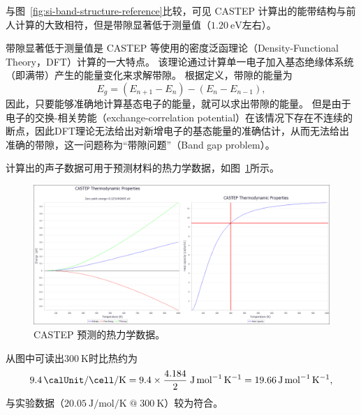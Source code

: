 与图~\ref{fig:si-band-structure-reference}比较，可见 CASTEP 计算出的能带结构与前人计算的大致相符\cite{phillips_band_1962,cardona_energy_band_1966}，但是带隙显著低于测量值（$\qty{1.20}{\electronvolt}$左右）。

带隙显著低于测量值是 CASTEP 等使用的密度泛函理论（Density-Functional Theory，DFT）计算的一大特点。
该理论通过计算单一电子加入基态绝缘体系统（即满带）产生的能量变化来求解带隙。
根据定义，带隙的能量为
\begin{equation}
    E_g = (E_{n+1} - E_n) - (E_n - E_{n-1}),
\end{equation}
因此，只要能够准确地计算基态电子的能量，就可以求出带隙的能量。
但是由于电子的交换-相关势能（exchange-correlation potential）在该情况下存在不连续的断点，因此DFT理论无法给出对新增电子的基态能量的准确估计，从而无法给出准确的带隙，这一问题称为“带隙问题”（Band gap problem）\cite{borlido_exchange-correlation_2020,sham_density-functional_1983}。

计算出的声子数据可用于预测材料的热力学数据，如图~\ref{fig:si-thermodynamics}所示。
\begin{figure}
    \centering
    \includegraphics[width=0.8\linewidth]{results/si-thermodynamics.png}
    \caption{CASTEP 预测的热力学数据。}
    \label{fig:si-thermodynamics}
\end{figure}
从图中可读出$\qty{300}{\kelvin}$时比热约为
\begin{equation}
    \qty{9.4}{\calUnit\per\cell\per\kelvin} = 9.4 \times \frac{4.184}{2} \; \unit{\joule\per\mole\per\kelvin} = \qty{19.66}{\joule\per\mole\per\kelvin},
\end{equation}
与实验数据（$\qty{20.05}{\joule\per\mole\per\kelvin} \; @ \; \qty{300}{\kelvin}$）较为符合。
